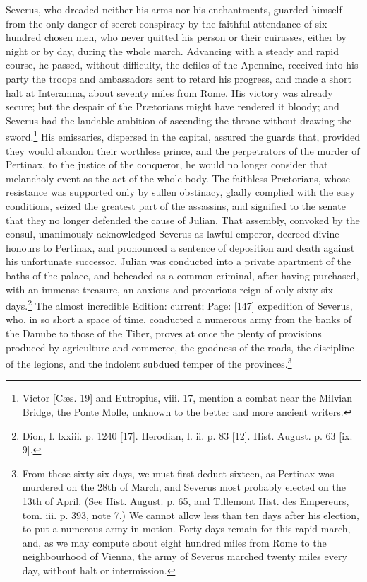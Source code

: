 Severus, who dreaded neither his arms nor his enchantments, guarded himself from the only danger of secret conspiracy by the faithful attendance of six hundred chosen men, who never quitted his person or their cuirasses, either by night or by day, during the whole march. Advancing with a steady and rapid course, he passed, without difficulty, the defiles of the Apennine, received into his party the troops and ambassadors sent to retard his progress, and made a short halt at Interamna, about seventy miles from Rome. His victory was already secure; but the despair of the Prætorians might have rendered it bloody; and Severus had the laudable ambition of ascending the throne without drawing the sword.\footnote{Victor [Cæs. 19] and Eutropius, viii. 17, mention a combat near the Milvian Bridge, the Ponte Molle, unknown to the better and more ancient writers.} His emissaries, dispersed in the capital, assured the guards that, provided they would abandon their worthless prince, and the perpetrators of the murder of Pertinax, to the justice of the conqueror, he would no longer consider that melancholy event as the act of the whole body. The faithless Prætorians, whose resistance was supported only by sullen obstinacy, gladly complied with the easy conditions, seized the greatest part of the assassins, and signified to the senate that they no longer defended the cause of Julian. That assembly, convoked by the consul, unanimously acknowledged Severus as lawful emperor, decreed divine honours to Pertinax, and pronounced a sentence of deposition and death against his unfortunate successor. Julian was conducted into a private apartment of the baths of the palace, and beheaded as a common criminal, after having purchased, with an immense treasure, an anxious and precarious reign of only sixty-six days.\footnote{Dion, l. lxxiii. p. 1240 [17]. Herodian, l. ii. p. 83 [12]. Hist. August. p. 63 [ix. 9].} The almost incredible Edition: current; Page: [147] expedition of Severus, who, in so short a space of time, conducted a numerous army from the banks of the Danube to those of the Tiber, proves at once the plenty of provisions produced by agriculture and commerce, the goodness of the roads, the discipline of the legions, and the indolent subdued temper of the provinces.\footnote{From these sixty-six days, we must first deduct sixteen, as Pertinax was murdered on the 28th of March, and Severus most probably elected on the 13th of April. (See Hist. August. p. 65, and Tillemont Hist. des Empereurs, tom. iii. p. 393, note 7.) We cannot allow less than ten days after his election, to put a numerous army in motion. Forty days remain for this rapid march, and, as we may compute about eight hundred miles from Rome to the neighbourhood of Vienna, the army of Severus marched twenty miles every day, without halt or intermission.}

